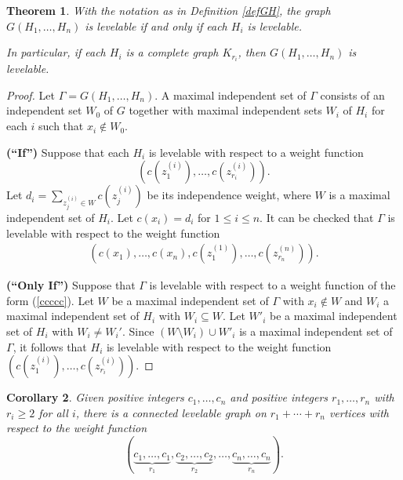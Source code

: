 \documentclass[12pt]{amsart}
\numberwithin{equation}{section}
\newtheorem{theorem}{Theorem}[section]
\newtheorem{corollary}[theorem]{Corollary}
\theoremstyle{definition}
\newcounter{i} %
\begin{document}
\begin{theorem}
\label{Sapporo}
With the notation as in Definition \ref{defGH}, the graph $G(H_1, \ldots, H_n)$ is levelable if and only if each $H_i$ is levelable. 

In particular, if each $H_i$ is a complete graph $K_{r_i}$, then $G(H_1, \ldots, H_n)$ is levelable.  
\end{theorem}

\begin{proof}
Let $\Gamma = G(H_1, \ldots, H_n)$.  A maximal independent set of $\Gamma$ consists of an independent set $W_0$ of $G$ together with maximal independent sets $W_i$ of $H_i$ for each $i$ such that $x_i \not\in W_0$.

{\bf (``If'')}  
Suppose that each $H_i$ is levelable with respect to a weight function \[(c(z^{(i)}_1), \ldots, c(z^{(i)}_{r_i})).\]  Let $d_i = \sum_{z^{(i)}_j \in W} c(z^{(i)}_j)$ be its independence weight, where $W$ is a maximal independent set of $H_i$.  Let $c(x_i) = d_i$ for $1 \leq i \leq n$. It can be checked that $\Gamma$ is levelable with respect to the weight function 
\begin{eqnarray}
    \label{ccccc}
(c(x_1), \ldots, c(x_n), c(z_1^{(1)}), \ldots, c(z_{r_n}^{(n)})).
\end{eqnarray}

{\bf (``Only If'')}
Suppose that $\Gamma$ is levelable with respect to a weight function of the form (\ref{ccccc}). Let $W$ be a maximal independent set of $\Gamma$ with $x_i \not\in W$ and $W_i$ a maximal independent set of $H_i$ with $W_i \subseteq W$.  Let $W'_i$ be a maximal independent set of $H_i$ with $W_i \neq W_i'$.  Since $(W \setminus W_i) \cup W'_i$ is a maximal independent set of $\Gamma$, it follows that $H_i$ is levelable with respect to the weight function $(c(z^{(i)}_1), \ldots, c(z^{(i)}_{r_i}))$.
\end{proof}


\begin{corollary}
\label{cor:AAA}
Given positive integers $c_1, \ldots, c_n$ and
positive integers $r_1,\ldots,r_n$ with $r_i \geq 2$ for all $i$,
there is a connected levelable graph on 
$r_1+\cdots +r_n$ vertices
with respect to the weight function 
\[
(\underbrace{c_1, \ldots,c_1}_{r_1}, \underbrace{c_2, 
\ldots, c_2}_{r_2}, \ldots, \underbrace{c_n, \ldots, c_n}_{r_n}).
\]
\end{corollary}
\end{document}
